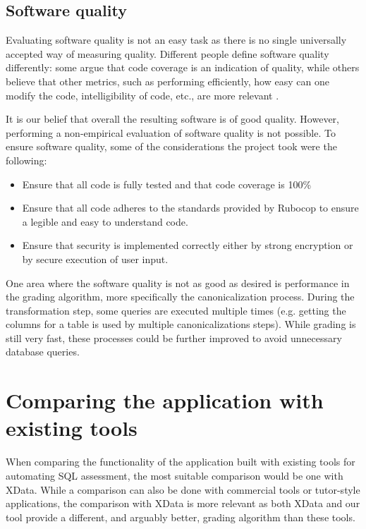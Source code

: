 \subsection{Software quality}

Evaluating software quality is not an easy task as there is no single universally accepted way of measuring quality. Different people define software quality differently: some argue that code coverage is an indication of quality, while others believe that other metrics, such as performing efficiently, how easy can one modify the code, intelligibility of code, etc., are more relevant \citep{msft_testing, Boehm:1976:QES:800253.807736}.

It is our belief that overall the resulting software is of good quality. However, performing a non-empirical evaluation of software quality is not possible. To ensure software quality, some of the considerations the project took were the following:
\begin{itemize}
    \item Ensure that all code is fully tested and that code coverage is 100\%
    \item Ensure that all code adheres to the standards provided by Rubocop to ensure a legible and easy to understand code.
    \item Ensure that security is implemented correctly either by strong encryption or by secure execution of user input.
\end{itemize}

One area where the software quality is not as good as desired is performance in the grading algorithm, more specifically the canonicalization process. During the transformation step, some queries are executed multiple times (e.g. getting the columns for a table is used by multiple canonicalizations steps). While grading is still very fast, these processes could be further improved to avoid unnecessary database queries.

\section{Comparing the application with existing tools}

When comparing the functionality of the application built with existing tools for automating SQL assessment, the most suitable comparison would be one with XData. While a comparison can also be done with commercial tools or tutor-style applications, the comparison with XData is more relevant as both XData and our tool provide a different, and arguably better, grading algorithm than these tools.

